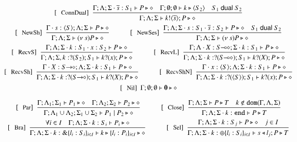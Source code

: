 \begin{figure}[!t]
\[\begin{array}{c}
		\trule{ConnDual}~~\tree{
			\Gamma; \Lambda; \Sigma \cat \dual{s}: S_1 \proves P \hastype \Proc  \quad \Gamma; \emptyset; \emptyset \proves k \hastype \chtype{S_2} \quad S_1 \dualof S_2
		}{
			\Gamma; \Lambda; \Sigma  \proves \bout{k}{\dual{s}} P \hastype \Proc
		}

		\\[4mm]

		\trule{NewSh}~~\tree{
			\Gamma\cat s:\chtype{S} ; \Lambda; \Sigma \proves P \hastype \Proc
		}{
			\Gamma; \Lambda; \Sigma \proves \news{s} P \hastype \Proc}
		\qquad\quad
		\trule{NewSes}~~\tree{
			\Gamma; \Lambda; \Sigma \cat s:S_1 \cat \dual{s}: S_2 \proves P \hastype \Proc \quad S_1 \dualof S_2
		}{
			\Gamma; \Lambda; \Sigma \proves \news{s} P \hastype \Proc
		}
		\\[4mm]

		\trule{RecvS}~~\tree{
			\Gamma; \Lambda; \Sigma \cat k: S_1 \cat x: S_2 \proves P \hastype \Proc
		}{
			\Gamma; \Lambda; \Sigma, k: \btinp{S_2} S_1  \vdash \binp{k}{x}P \hastype \Proc
		}
		\qquad\quad 
		\trule{RecvL}~~\tree{
			\Gamma; \Lambda \cat X: \lhot{S}; \Sigma \cat k: S_1  \proves P \hastype \Proc
		}{
			\Gamma; \Lambda; \Sigma \cat k:\btinp{\lhot{S}}S_1  \proves \binp{k}{X}P \hastype \Proc
		}
		\\[4mm]

		\trule{RecvSh}~~\tree{
			\Gamma \cat X: \shot{S}; \Lambda; \Sigma \cat k: S_1  \proves P \hastype \Proc
		}{
			\Gamma; \Lambda; \Sigma \cat k:\btinp{\shot{S}}S_1  \proves \binp{k}{X}P \hastype \Proc
		}
		\qquad \quad
		\trule{RecvShN}~~\tree{
			\Gamma \cat x: \chtype{S}; \Lambda; \Sigma \cat k: S_1  \proves P \hastype \Proc
		}{
			\Gamma; \Lambda; \Sigma \cat k:\btinp{\chtype{S}}S_1  \proves \binp{k}{x}P \hastype \Proc
		}
		\\[4mm]

		\trule{Nil}~~\Gamma; \emptyset; \emptyset \proves \inact \hastype \Proc
		\\[4mm]

		\trule{Par}~~\tree{
			\Gamma; \Lambda_{1}; \Sigma_{1} \proves P_{1} \hastype \Proc \quad \Gamma; \Lambda_{2}; \Sigma_{2} \proves P_{2} \hastype \Proc
		}{
			\Gamma; \Lambda_{1} \cup \Lambda_2; \Sigma_{1} \cup \Sigma_2 \proves P_1 \Par P_2 \hastype \Proc
		}
		\qquad\quad
		\trule{Close}~~\tree{
			\Gamma; \Lambda; \Sigma  \proves P \hastype T \quad k \not\in \dom{\Gamma, \Lambda,\Sigma}
		}{
			\Gamma; \Lambda; \Sigma \cat k: \tinact  \proves P \hastype T
		}
		\\[4mm]
		\trule{Bra}~~\tree{
			 \forall i \in I \quad \Gamma; \Lambda; \Sigma \cat k:S_i \proves P_i \hastype \Proc
		}{
			\Gamma; \Lambda; \Sigma \cat k: \btbra{l_i:S_i}_{i \in I} \proves \bbra{k}{l_i:P_i}_{i \in I}\hastype \Proc
		}
		\qquad\quad 
	 	\trule{Sel}~~\tree{
			\Gamma; \Lambda; \Sigma \cat k: S_j  \proves P \hastype \Proc \quad j \in I
		}{
			\Gamma; \Lambda; \Sigma \cat k:\btsel{l_i:S_i}_{i \in I} \proves \bsel{s}{l_j} P \hastype T
		}
		\\[4mm]


\end{array}\]
\end{figure}
